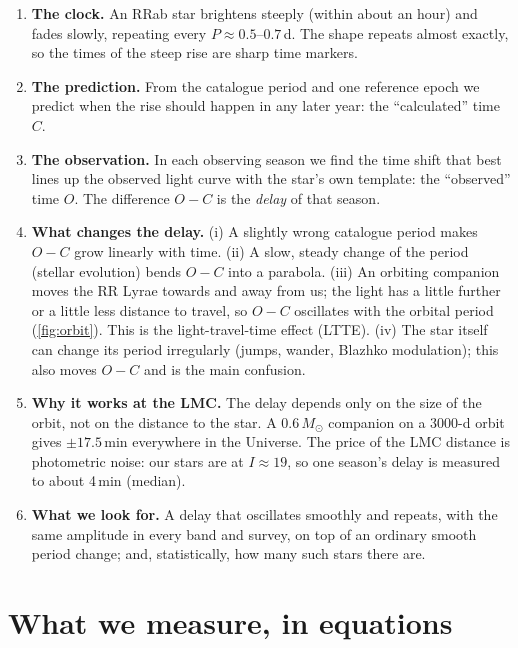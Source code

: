 \documentclass[11pt]{article}
\newcommand{\Msun}{\ensuremath{M_\odot}}
\begin{document}
\begin{enumerate}[leftmargin=*]
\item \textbf{The clock.} An RRab star brightens steeply (within about an hour) and fades slowly, repeating every
$P\approx0.5$--$0.7$\,d. The shape repeats almost exactly, so the times of the steep rise are sharp time markers.
\item \textbf{The prediction.} From the catalogue period and one reference epoch we predict when the rise should
happen in any later year: the ``calculated'' time $C$.
\item \textbf{The observation.} In each observing season we find the time shift that best lines up the observed light
curve with the star's own template: the ``observed'' time $O$. The difference $O-C$ is the \emph{delay} of that season.
\item \textbf{What changes the delay.} (i) A slightly wrong catalogue period makes $O-C$ grow linearly with time.
(ii) A slow, steady change of the period (stellar evolution) bends $O-C$ into a parabola.
(iii) An orbiting companion moves the RR Lyrae towards and away from us; the light has a little further or a little
less distance to travel, so $O-C$ oscillates with the orbital period (\cref{fig:orbit}). This is the
light-travel-time effect (LTTE).
(iv) The star itself can change its period irregularly (jumps, wander, Blazhko modulation); this also moves
$O-C$ and is the main confusion.
\item \textbf{Why it works at the LMC.} The delay depends only on the size of the orbit, not on the distance to the star.
A $0.6\,\Msun$ companion on a 3000-d orbit gives $\pm17.5$\,min everywhere in the Universe. The price of the LMC
distance is photometric noise: our stars are at $I\approx19$, so one season's delay is measured to about 4\,min (median).
\item \textbf{What we look for.} A delay that oscillates smoothly and repeats, with the same amplitude in every band and
survey, on top of an ordinary smooth period change; and, statistically, how many such stars there are.
\end{enumerate}

\section{What we measure, in equations}\label{sec:eqs}
\end{document}
